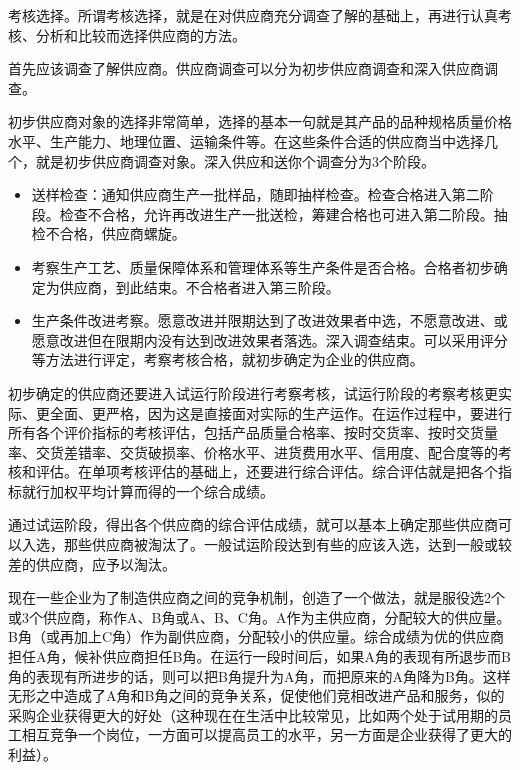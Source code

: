     \begin{enumerate.zh}
    \item 考核选择。所谓考核选择，就是在对供应商充分调查了解的基础上，再进行认真考核、分析和比较而选择供应商的方法。

    首先应该调查了解供应商。供应商调查可以分为初步供应商调查和深入供应商调查。

    初步供应商对象的选择非常简单，选择的基本一句就是其产品的品种规格质量价格水平、生产能力、地理位置、运输条件等。在这些条件合适的供应商当中选择几个，就是初步供应商调查对象。深入供应和送你个调查分为3个阶段。

        \begin{itemize}
            \item  送样检查：通知供应商生产一批样品，随即抽样检查。检查合格进入第二阶段。检查不合格，允许再改进生产一批送检，筹建合格也可进入第二阶段。抽检不合格，供应商螺旋。

            \item  考察生产工艺、质量保障体系和管理体系等生产条件是否合格。合格者初步确定为供应商，到此结束。不合格者进入第三阶段。

            \item  生产条件改进考察。愿意改进并限期达到了改进效果者中选，不愿意改进、或愿意改进但在限期内没有达到改进效果者落选。深入调查结束。可以采用评分等方法进行评定，考察考核合格，就初步确定为企业的供应商。

        \end{itemize}

    初步确定的供应商还要进入试运行阶段进行考察考核，试运行阶段的考察考核更实际、更全面、更严格，因为这是直接面对实际的生产运作。在运作过程中，要进行所有各个评价指标的考核评估，包括产品质量合格率、按时交货率、按时交货量率、交货差错率、交货破损率、价格水平、进货费用水平、信用度、配合度等的考核和评估。在单项考核评估的基础上，还要进行综合评估。综合评估就是把各个指标就行加权平均计算而得的一个综合成绩。

    通过试运阶段，得出各个供应商的综合评估成绩，就可以基本上确定那些供应商可以入选，那些供应商被淘汰了。一般试运阶段达到有些的应该入选，达到一般或较差的供应商，应予以淘汰。

    现在一些企业为了制造供应商之间的竞争机制，创造了一个做法，就是服役选2个或3个供应商，称作A、B角或A、B、C角。A作为主供应商，分配较大的供应量。B角（或再加上C角）作为副供应商，分配较小的供应量。综合成绩为优的供应商担任A角，候补供应商担任B角。在运行一段时间后，如果A角的表现有所退步而B角的表现有所进步的话，则可以把B角提升为A角，而把原来的A角降为B角。这样无形之中造成了A角和B角之间的竞争关系，促使他们竞相改进产品和服务，似的采购企业获得更大的好处（这种现在在生活中比较常见，比如两个处于试用期的员工相互竞争一个岗位，一方面可以提高员工的水平，另一方面是企业获得了更大的利益）。


\end{enumerate.zh}
